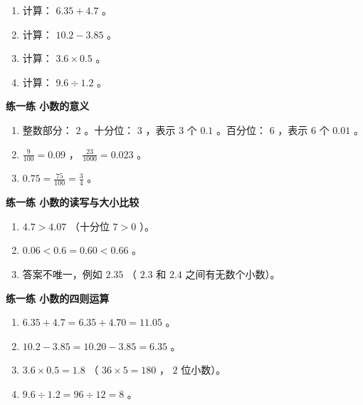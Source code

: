 \begin{practice}


\begin{enumerate}
  \item 计算： $6.35 + 4.7$ 。
  \item 计算： $10.2 - 3.85$ 。
  \item 计算： $3.6 \times 0.5$ 。
  \item 计算： $9.6 \div 1.2$ 。
\end{enumerate}


\end{practice}



\begin{answer}


\textbf{练一练 小数的意义}

\begin{enumerate}
  \item 整数部分： $2$ 。十分位： $3$ ，表示 $3$ 个 $0.1$ 。百分位： $6$ ，表示 $6$ 个 $0.01$ 。
  \item $\frac{9}{100} = 0.09$ ， $\frac{23}{1000} = 0.023$ 。
  \item $0.75 = \frac{75}{100} = \frac{3}{4}$ 。
\end{enumerate}


\textbf{练一练 小数的读写与大小比较}

\begin{enumerate}
  \item $4.7 > 4.07$ （十分位 $7 > 0$ ）。
  \item $0.06 < 0.6 = 0.60 < 0.66$ 。
  \item 答案不唯一，例如 $2.35$ （ $2.3$ 和 $2.4$ 之间有无数个小数）。
\end{enumerate}


\textbf{练一练 小数的四则运算}

\begin{enumerate}
  \item $6.35 + 4.7 = 6.35 + 4.70 = 11.05$ 。
  \item $10.2 - 3.85 = 10.20 - 3.85 = 6.35$ 。
  \item $3.6 \times 0.5 = 1.8$ （ $36 \times 5 = 180$ ， $2$ 位小数）。
  \item $9.6 \div 1.2 = 96 \div 12 = 8$ 。
\end{enumerate}


\end{answer}
